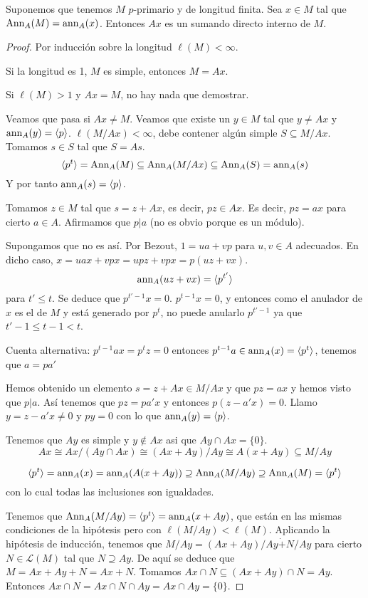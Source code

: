 \begin{prop}
  Suponemos que tenemos \(M\) \(p\)-primario y de longitud finita. Sea
  \(x\in M\) tal que \(\operatorname{Ann}_A(M)=\operatorname{ann}_A(x)\). Entonces \(Ax\) es un
  sumando directo interno de \(M\).
\end{prop}
\begin{proof}
  Por inducción sobre la longitud \(\ell(M)<\infty\).

  Si la longitud es 1, \(M\) es simple, entonces \(M=Ax\).

  Si \(\ell(M)>1\) y \(Ax=M\), no hay nada que demostrar.

  Veamos que pasa si \(Ax\neq M\). Veamos que existe un \(y \in M\)
  tal que \(y\neq Ax\) y \(\operatorname{ann}_A(y)=\langle p\rangle\).
  \(
    \ell(M/Ax)<\infty
  \), debe contener algún simple \(S\subseteq M/Ax\). Tomamos \(s\in S\)
  tal que \(S=As\).
  \[
    \langle p^t\rangle =\operatorname{Ann}_A(M)\subseteq\operatorname{Ann}_A(M/Ax)\subseteq\operatorname{Ann}_A(S)
    =\operatorname{ann}_A(s)
  \]
  Y por tanto \(\operatorname{ann}_A(s)=\langle p\rangle\).

  Tomamos \(z\in M\) tal que \(s=z+Ax\), es decir, \(p z\in Ax\). Es decir,
  \(p z=ax\) para cierto \(a\in A\). Afirmamos que \(p|a\) (no es obvio
  porque es un módulo).

  Supongamos que no es así. Por Bezout, \(1=ua+vp\) para \(u,v\in A\)
  adecuados. En dicho caso, \(x=uax+vpx=upz+vpx=p(uz+vx)\).
  \[
    \operatorname{ann}_A(uz+vx)=\langle p^{t'}\rangle
  \]
  para \(t'\le t\). Se deduce que \(p^{t'-1} x=0\). \(p^{t-1}x=0\), y
  entonces como el anulador de \(x\) es el de \(M\) y está generado
  por \(p^t\), no puede anularlo \(p^{t'-1}\) ya que
  \(t'-1\le t-1<t\).

  Cuenta alternativa: \(p^{t-1}ax=p^t z=0\) entonces \(p^{t-1} a
  \in\operatorname{ann}_A(x)=\langle p^t\rangle\), tenemos que \(a=pa'\)

  Hemos obtenido un elemento \(s=z+Ax\in M/Ax\) y que \(pz=ax\) y hemos
  visto que \(p|a\). Así tenemos que \(pz=pa'x\) y entonces
  \(p(z-a'x)=0\). Llamo \(y=z-a'x\neq 0\) y \(py=0\) con lo que
  \(\operatorname{ann}_A(y)=\langle p\rangle\).

  Tenemos que \(Ay\) es simple y \(y\notin Ax\) asi que \(Ay\cap Ax=
  \{0\}\).
  \[
    Ax\cong Ax/(Ay\cap Ax)\cong (Ax+Ay)/Ay\cong A(x+Ay)\subseteq M/Ay
  \]

  \[
    \langle p^t\rangle=\operatorname{ann}_A(x)=\operatorname{ann}_A(A(x+Ay))\supseteq
    \operatorname{Ann}_A(M/Ay)\supseteq\operatorname{Ann}_A(M)=\langle p^t\rangle
  \]
  con lo cual todas las inclusiones son igualdades.

  Tenemos que \(\operatorname{Ann}_A(M/Ay)=\langle p^t\rangle=\operatorname{ann}_A(x+Ay)\), que
  están en las mismas condiciones de la hipótesis pero
  con \(\ell(M/Ay)<\ell(M)\). Aplicando la hipótesis de inducción,
  tenemos que \(M/Ay=(Ax+Ay)/Ay \dot{+} N/Ay\) para cierto
  \(N\in\mathcal{L}(M)\) tal que \(N\supseteq Ay\). De aquí se deduce
  que \(M=Ax+Ay+N=Ax+N\). Tomamos \(Ax\cap N\subseteq(Ax+Ay)\cap N=Ay\).
  Entonces \(Ax\cap N = Ax\cap N\cap Ay= Ax\cap Ay=\{0\}\).

\end{proof}
